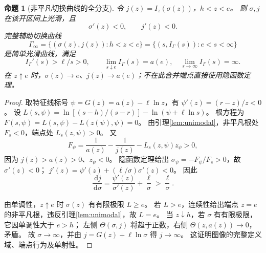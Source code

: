 \documentclass[11pt,a4paper,UTF8]{ctexart}
\newtheorem{proposition}[theorem]{命题}
\theoremstyle{definition}
\newcommand{\dd}{\,\mathrm d}
\begin{document}
\begin{proposition}[非平凡切换曲线的全分支]
\label{prop:Gamma-geometry}
令 $j(z)=I_z(\sigma(z))$，$h<z<e$。
则 $\sigma,j$ 在该开区间上光滑，且
\begin{equation}
\sigma'(z)<0,\qquad j'(z)<0.
\label{eq:sigma-monotone}
\end{equation}
完整辅助切换曲线
\begin{equation}
\Gamma_\infty=\{(\sigma(z),j(z)):h<z<e\}
=\{(s,I_\Gamma(s)):e<s<\infty\}
\label{eq:switch-param}
\end{equation}
是简单光滑曲线，满足
\begin{equation}
I_\Gamma'(s)>\ell/s>0,
\qquad
\lim_{s\downarrow e}I_\Gamma(s)=a(e),\quad
\lim_{s\to\infty}I_\Gamma(s)=\infty.
\label{eq:Gamma-slope}
\end{equation}
在 $z\uparrow e$ 时，$\sigma(z)\to e$、$j(z)\to a(e)$；不在此合并端点直接使用隐函数定理。
\end{proposition}
\begin{proof}
取特征线标号 $\psi=G(z)=a(z)-\ell\ln z$，有 $\psi'(z)=(r-z)/z<0$。
设 $L(s,\psi)=\ln[(s-h)/(s-r)]-\ln(\psi+\ell\ln s)$。
根方程为 $F(s,\psi)=L(s,\psi)-L(z(\psi),\psi)=0$。
由引理\ref{lem:unimodal}，非平凡根处 $F_s<0$，端点处 $L_s(z,\psi)>0$。
又
\[
F_\psi=\frac1{a(z)}-\frac1{j(z)}-L_s(z,\psi)z_\psi>0,
\]
因为 $j(z)>a(z)>0$、$z_\psi<0$。
隐函数定理给出 $\sigma_\psi=-F_\psi/F_s>0$，故 $\sigma'(z)<0$；
$j'(z)=\psi'(z)+(\ell/\sigma)\sigma'(z)<0$。
因此
\[
\frac{\dd j}{\dd\sigma}=\frac{\psi'(z)}{\sigma'(z)}+\frac\ell\sigma>\frac\ell\sigma.
\]

由单调性，$z\uparrow e$ 时 $\sigma(z)$ 有有限极限 $L\ge e$。
若 $L>e$，连续性给出端点 $z=e$ 的非平凡根，违反引理\ref{lem:unimodal}，故 $L=e$。
当 $z\downarrow h$，若 $\sigma$ 有有限极限，它因单调性大于 $e>h$；
左侧 $\Theta(\sigma,j)$ 将趋于正数，右侧 $\Theta(z,a(z))\to0$，矛盾。
故 $\sigma\to\infty$，并由 $j=G(z)+\ell\ln\sigma$ 得 $j\to\infty$。
这证明图像的完整定义域、端点行为及单射性。
\end{proof}
\end{document}
